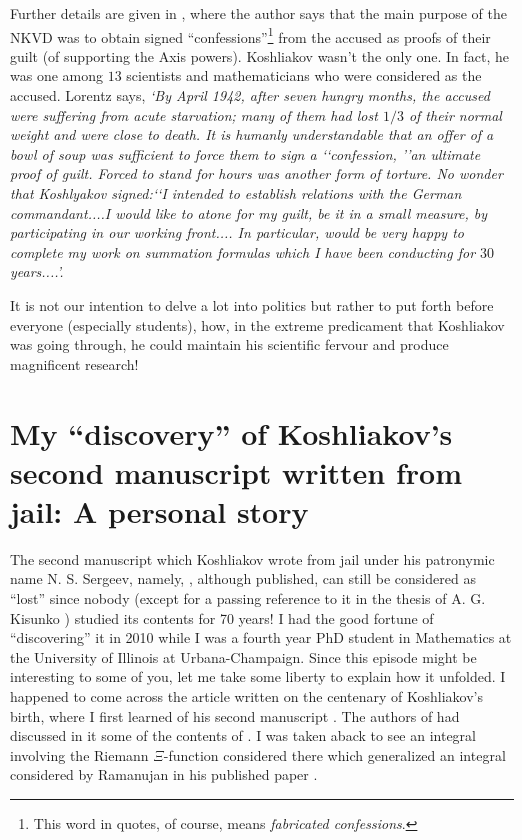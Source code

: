 \documentclass[12pt,reqno]{amsart}
\renewcommand{\(}{\left\(}
\renewcommand{\)}{\right\)}
\renewcommand{\[}{\left\[}
\renewcommand{\]}{\right\]}
\numberwithin{equation}{section}
\theoremstyle{plain}
\begin{document}
Further details are given in \cite[p.~211--213]{lorentz}, where the author says that the main purpose of the NKVD was to obtain signed ``confessions''\footnote{This word in quotes, of course, means \emph{fabricated confessions}.} from the accused as proofs of their guilt (of supporting the Axis powers). Koshliakov wasn't the only one. In fact, he was one among $13$ scientists and mathematicians who were considered as the accused. Lorentz \cite[p.~212]{lorentz} says, \emph{`By April 1942, after seven hungry months, the accused were suffering
from acute starvation; many of them had lost $1/3$ of their normal weight
and were close to death. It is humanly understandable that an offer of a
 bowl of soup was sufficient to force them to sign a ‘‘confession, ’’an ultimate proof of guilt. Forced to stand for hours was another form of torture.
No wonder that Koshlyakov signed:‘‘I intended to establish relations with
the German commandant....I would like to atone for my guilt, be it in a
small measure, by participating in our working front.... In particular,
would be very happy to complete my work on summation formulas which
I have been conducting for $30$ years....’.}

It is not our intention to delve a lot into politics but rather to put forth before everyone (especially students), how, in the extreme predicament that Koshliakov was going through, he could maintain his scientific fervour and produce magnificent research!

\section{My ``discovery'' of Koshliakov's second manuscript written from jail: A personal story}

 The second manuscript which Koshliakov wrote from jail under his patronymic name N. S. Sergeev, namely, \cite{koshliakov3}, although published, can still be considered as ``lost'' since nobody (except for a passing reference to it in the thesis of A. G. Kisunko \cite[p.~4]{kisunko}) studied its contents for 70 years! I had the good fortune of ``discovering'' it in 2010 while I was a fourth year PhD student in Mathematics at the University of Illinois at Urbana-Champaign. Since this episode might be interesting to some of you, let me take some liberty to explain how it unfolded. I happened to come across the article \cite{bfikm} written on the centenary of Koshliakov's birth, where I first learned of his second manuscript \cite{koshliakov3}. The authors of \cite{bfikm} had discussed in it some of the contents of \cite{koshliakov3}. I was taken aback to see an  integral involving the Riemann $\Xi$-function  considered there which generalized an integral considered by Ramanujan in his published paper \cite{riemann}. 
 
\end{document}

